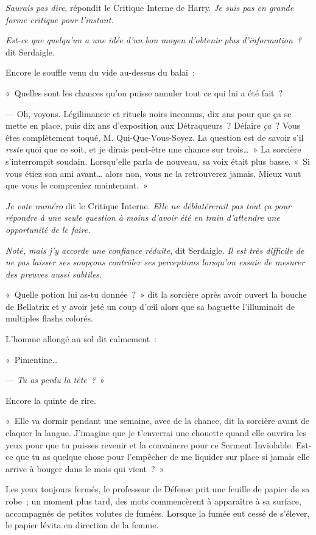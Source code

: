 \emph{Saurais pas dire}, répondit le Critique Interne de Harry.
\emph{Je suis pas en grande forme critique pour l'instant.}

\emph{Est-ce que quelqu'un a une idée d'un bon moyen d'obtenir plus d'information~?} dit Serdaigle.

Encore le souffle venu du vide au-dessus du balai~:

«~Quelles sont les chances qu'on puisse annuler tout ce qui lui a été fait~?

--- Oh, voyons.
Légilimancie et rituels noirs inconnus, dix ans pour que ça se mette en place, puis dix ans d'exposition aux Détraqueurs~?
Défaire \emph{ça}~?
Vous êtes complètement toqué, M. Qui-Que-Vous-Soyez.
La question est de savoir s'il \emph{reste} quoi que ce soit, et je dirais peut-être une chance sur trois…~»
La sorcière s'interrompit soudain.
Lorsqu'elle parla de nouveau, sa voix était plus basse.
«~Si vous étiez son ami avant… alors non, vous ne la retrouverez jamais.
Mieux vaut que vous le compreniez maintenant.~»

\emph{Je vote numéro} dit le Critique Interne.
\emph{Elle ne déblatérerait pas tout ça pour répondre à une seule question à moins d'avoir été en train d'attendre une opportunité de le faire.}

\emph{Noté, mais j'y accorde une confiance réduite}, dit Serdaigle.
\emph{Il est très difficile de ne pas laisser ses soupçons contrôler ses perceptions lorsqu'on essaie de mesurer des preuves aussi subtiles.}

«~Quelle potion lui as-tu donnée~?~»
dit la sorcière après avoir ouvert la bouche de Bellatrix et y avoir jeté un coup d'œil alors que sa baguette l'illuminait de multiples flashs colorés.

L'homme allongé au sol dit calmement~:

«~Pimentine…

--- \emph{Tu as perdu la tête~?}~»

Encore la quinte de rire.

«~Elle va dormir pendant une semaine, avec de la chance, dit la sorcière avant de claquer la langue.
J'imagine que je t'enverrai une chouette quand elle ouvrira les yeux pour que tu puisses revenir et la convaincre pour ce Serment Inviolable.
Est-ce que tu as quelque chose pour l'empêcher de me liquider sur place si jamais elle arrive à bouger dans le mois qui vient~?~»

Les yeux toujours fermés, le professeur de Défense prit une feuille de papier de sa robe~; un moment plus tard, des mots commencèrent à apparaître à sa surface, accompagnés de petites volutes de fumées.
Lorsque la fumée eut cessé de s'élever, le papier lévita en direction de la femme.

